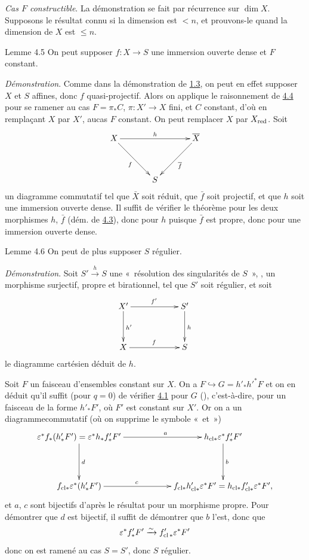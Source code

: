 \documentclass[10pt]{../fichiers-configuration-latex/smfart}
\begin{document}
\medskip
\noindent
\emph{Cas $F$ constructible}. La démonstration se fait par récurrence
sur $\dim X$. Supposons le résultat connu si la dimension est $<n$, et
prouvons-le quand la dimension de $X$ est $\leq n$.

\begin{enonce*}{Lemme 4.5}
On peut supposer $f:X\rightarrow S$ une immersion ouverte dense et $F$
constant.
\end{enonce*}

\noindent
\emph{Démonstration}. Comme dans la démonstration de \hyperref[XVI.lem1.3]{1.3}, on peut en
effet supposer $X$ et $S$ affines, donc $f$ quasi-projectif. Alors on
applique le raisonnement de \hyperref[XVI.lem4.4]{4.4} pour se ramener au cas
$F=\pi_{\ast}C$, $\pi:X'\rightarrow X$ fini, et $C$ constant, d'où en
remplaçant $X$ par $X'$, au\pageoriginale cas $F$ constant. 
On peut remplacer $X$ par $X_{\operatorname{red}}$. Soit
$$
\xymatrix@=1.25cm{
  X  \ar[rr]^{h}\ar[rd]_{f} &      &\bar{X} \ar[ld]^{\bar{f}}\\
             &     S  &   
}
$$
un diagramme commutatif tel que $\bar{X}$ soit réduit, que $\bar{f}$
soit projectif, et que $h$ soit  une immersion ouverte dense. Il
suffit de vérifier le théorème pour les deux morphismes $h$, $\bar{f}$
(\cf dém. de \hyperref[XVI.lem4.3]{4.3}), donc pour $h$ puisque $\bar{f}$ est propre, donc
pour une immersion ouverte dense.

\begin{enonce*}{Lemme 4.6}
On peut de plus supposer $S$ régulier.
\end{enonce*}

\noindent
\emph{Démonstration}. Soit $S'\xrightarrow{h}S$ une « résolution
des singularités de $S$ », \ie, un morphisme surjectif, propre et
birationnel, tel que $S'$ soit régulier, et soit
$$
\xymatrix@C=2cm@R=1.25cm{
X'     \ar[r]^{f'} \ar[d]^{h'}&     S'\ar[d]^{h}\\
X   \ar[r]^{f}  & S
}
$$
le diagramme cartésien déduit de $h$.

Soit $F$ un faisceau d'ensembles constant sur $X$. On a
$F\hookrightarrow G=h'_{\ast}{h'}^{\ast}F$ et on en déduit qu'il
suffit (pour $q=0$) de vérifier \hyperref[XVI.thm4.1]{4.1} pour $G$ (\cf {}),
c'est-à-dire, pour un faisceau de la forme ${h'}_{\ast}F'$, où $F'$
est constant sur $X'$. Or on a un diagramme\pageoriginale commutatif
(où on supprime le symbole « et »)
$$
\xymatrix@C=2cm@R=1.5cm{
\varepsilon^{\ast}f_{\ast} (h'_{\ast}F') = \varepsilon^{\ast}h_{\ast}f'_{\ast}F'  \ar[d]^{d}\ar[r]^(.6){a} & h_{\text{cl}\ast}
	    \varepsilon^{\ast}f'_{\ast}F' \ar[d]^{b}\\
	    f_{\text{cl}\ast}\varepsilon^{\ast}(h'_{\ast}F')  \ar[r]^(.4){c} &
	    f_{\text{cl}\ast} h'_{\text{cl}\ast}\varepsilon^{\ast}F' = h_{\text{cl}\ast}f'_{\text{cl}\ast}
	    \varepsilon^{\ast}F',
}
$$
et $a$, $c$ sont bijectifs d'après le résultat pour un morphisme
propre. Pour démontrer que $d$ est bijectif, il suffit de démontrer
que $b$ l'est, donc que
$$
\varepsilon^{\ast}f'_{\ast}F'\xrightarrow{\sim}
f'_{\operatorname{cl}\ast}\varepsilon^{\ast}F'
$$
donc on est ramené au cas $S=S'$, donc $S$ régulier.
\end{document}
